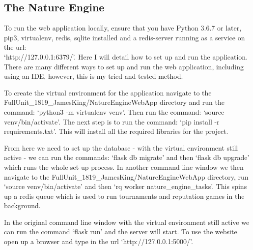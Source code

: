 \documentclass[]{final_report}
\begin{document}
\subsection{The Nature Engine}
To run the web application locally, ensure that you have Python 3.6.7 or later, pip3, virtualenv, redis, sqlite installed and a redis-server running as a service on the url:\\ `http://127.0.0.1:6379/'. Here I will detail how to set up and run the application. There are many different ways to set up and run the web application, including using an IDE, however, this is my tried and tested method.\par
To create the virtual environment for the application navigate to the\\ FullUnit\_1819\_JamesKing/NatureEngineWebApp directory and run the command: `python3 -m virtualenv venv'. Then run the command: `source venv/bin/activate'. The next step is to run the command: `pip install -r requirements.txt'. This will install all the required libraries for the project.\par 
From here we need to set up the database - with the virtual environment still active - we can run the commands: `flask db migrate' and then `flask db upgrade' which runs the whole set up process. In another command line window we then navigate to the FullUnit\_1819\_JamesKing/NatureEngineWebApp directory, run `source venv/bin/activate' and then `rq worker nature\_engine\_tasks'. This spins up a redis queue which is used to run tournaments and reputation games in the background.\par 
In the original command line window with the virtual environment still active we can run the command `flask run' and the server will start. To use the website open up a browser and type in the url `http://127.0.0.1:5000/'.
\end{document}
